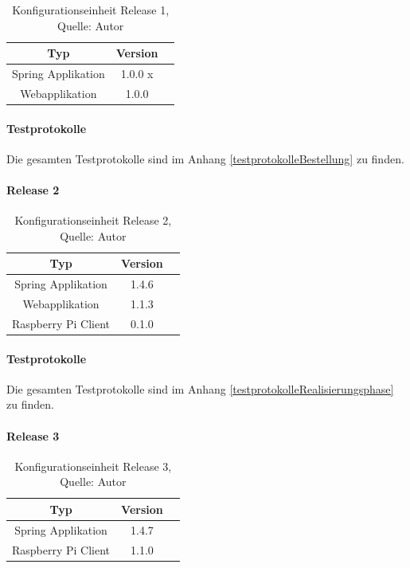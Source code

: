 \begin{table}[H]
\setlength\extrarowheight{2pt} %
\begin{tabularx}{\textwidth}{|C|C|C|}
\hline
\textbf{Typ} &  \textbf{Version}  \\
\hline
Spring Applikation & 1.0.0 x\\
\hline
Webapplikation  & 1.0.0\\

\hline
\end{tabularx}
\caption{ \label{tbl: Konfigurationseinheit Release 1}Konfigurationseinheit Release 1, Quelle: Autor}
\end{table}

\paragraph{Testprotokolle}
Die gesamten Testprotokolle sind im Anhang \ref{testprotokolleBestellung} zu finden. 

\paragraph{Release 2}

\begin{table}[H]
	\setlength\extrarowheight{2pt} %
	\begin{tabularx}{\textwidth}{|C|C|C|}
		\hline
		\textbf{Typ} &  \textbf{Version}  \\
		\hline
		Spring Applikation & 1.4.6\\
		\hline
		Webapplikation  & 1.1.3\\
		\hline
		Raspberry Pi Client  & 0.1.0\\
		\hline
	\end{tabularx}
	\caption{ \label{tbl: Konfigurationseinheit Release 2}Konfigurationseinheit Release 2, Quelle: Autor}
\end{table}

\paragraph{Testprotokolle}
Die gesamten Testprotokolle sind im Anhang \ref{testprotokolleRealisierungsphase} zu finden. 
\paragraph{Release 3}

\begin{table}[H]
	\setlength\extrarowheight{2pt} %
	\begin{tabularx}{\textwidth}{|C|C|C|}
		\hline
		\textbf{Typ} &  \textbf{Version}  \\
		\hline
		Spring Applikation & 1.4.7\\
		\hline
		Raspberry Pi Client  & 1.1.0\\
		\hline
	\end{tabularx}
	\caption{ \label{tbl: Konfigurationseinheit Release 3}Konfigurationseinheit Release 3, Quelle: Autor}
\end{table}


